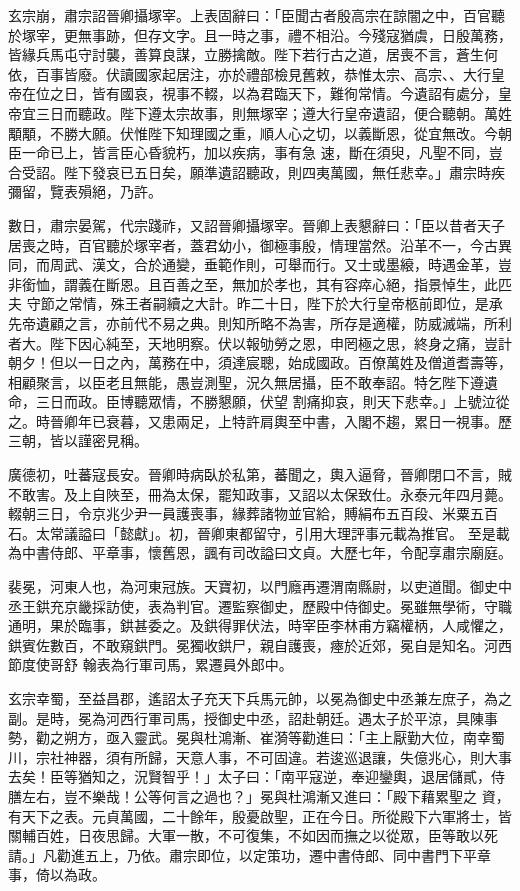 \begin{pinyinscope}
 玄宗崩，肅宗詔晉卿攝塚宰。上表固辭曰：「臣聞古者殷高宗在諒闇之中，百官聽於塚宰，更無事跡，但存文字。且一時之事，禮不相沿。今殘寇猶虞，日殷萬務，
 皆緣兵馬屯守討襲，善算良謀，立勝擒敵。陛下若行古之道，居喪不言，蒼生何依，百事皆廢。伏讀國家起居注，亦於禮部檢見舊敕，恭惟太宗、高宗、、大行皇帝在位之日，皆有國哀，視事不輟，以為君臨天下，難徇常情。今遺詔有處分，皇帝宜三日而聽政。陛下遵太宗故事，則無塚宰；遵大行皇帝遺詔，便合聽朝。萬姓顒顒，不勝大願。伏惟陛下知理國之重，順人心之切，以義斷恩，從宜無改。今朝臣一命已上，皆言臣心昏貌朽，加以疾病，事有急
 速，斷在須臾，凡聖不同，豈合受詔。陛下發哀已五日矣，願準遺詔聽政，則四夷萬國，無任悲幸。」肅宗時疾彌留，覽表殞絕，乃許。



 數日，肅宗晏駕，代宗踐祚，又詔晉卿攝塚宰。晉卿上表懇辭曰：「臣以昔者天子居喪之時，百官聽於塚宰者，蓋君幼小，御極事殷，情理當然。沿革不一，今古異同，而周武、漢文，合於通變，垂範作則，可舉而行。又士或墨縗，時遇金革，豈非銜恤，謂義在斷恩。且百善之至，無加於孝也，其有容瘁心絕，指景悼生，此匹夫
 守節之常情，殊王者嗣續之大計。昨二十日，陛下於大行皇帝柩前即位，是承先帝遺顧之言，亦前代不易之典。則知所略不為害，所存是適權，防威滅端，所利者大。陛下因心純至，天地明察。伏以報劬勞之恩，申罔極之思，終身之痛，豈計朝夕！但以一日之內，萬務在中，須達宸聰，始成國政。百僚萬姓及僧道耆壽等，相顧聚言，以臣老且無能，愚豈測聖，況久無居攝，臣不敢奉詔。特乞陛下遵遺命，三日而政。臣博聽眾情，不勝懇願，伏望
 割痛抑哀，則天下悲幸。」上號泣從之。時晉卿年已衰暮，又患兩足，上特許肩輿至中書，入閣不趨，累日一視事。歷三朝，皆以謹密見稱。



 廣德初，吐蕃寇長安。晉卿時病臥於私第，蕃聞之，輿入逼脅，晉卿閉口不言，賊不敢害。及上自陜至，冊為太保，罷知政事，又詔以太保致仕。永泰元年四月薨。輟朝三日，令京兆少尹一員護喪事，緣葬諸物並官給，賻絹布五百段、米粟五百石。太常議謚曰「懿獻」。初，晉卿東都留守，引用大理評事元載為推官。
 至是載為中書侍郎、平章事，懷舊恩，諷有司改謚曰文貞。大歷七年，令配享肅宗廟庭。



 裴冕，河東人也，為河東冠族。天寶初，以門廕再遷渭南縣尉，以吏道聞。御史中丞王鉷充京畿採訪使，表為判官。遷監察御史，歷殿中侍御史。冕雖無學術，守職通明，果於臨事，鉷甚委之。及鉷得罪伏法，時宰臣李林甫方竊權柄，人咸懼之，鉷賓佐數百，不敢窺鉷門。冕獨收鉷尸，親自護喪，瘞於近郊，冕自是知名。河西節度使哥舒
 翰表為行軍司馬，累遷員外郎中。



 玄宗幸蜀，至益昌郡，遙詔太子充天下兵馬元帥，以冕為御史中丞兼左庶子，為之副。是時，冕為河西行軍司馬，授御史中丞，詔赴朝廷。遇太子於平涼，具陳事勢，勸之朔方，亟入靈武。冕與杜鴻漸、崔漪等勸進曰：「主上厭勤大位，南幸蜀川，宗社神器，須有所歸，天意人事，不可固違。若逡巡退讓，失億兆心，則大事去矣！臣等猶知之，況賢智乎！」太子曰：「南平寇逆，奉迎鑾輿，退居儲貳，侍膳左右，豈不樂哉！公等何言之過也？」冕與杜鴻漸又進曰：「殿下藉累聖之
 資，有天下之表。元貞萬國，二十餘年，殷憂啟聖，正在今日。所從殿下六軍將士，皆關輔百姓，日夜思歸。大軍一散，不可復集，不如因而撫之以從眾，臣等敢以死請。」凡勸進五上，乃依。肅宗即位，以定策功，遷中書侍郎、同中書門下平章事，倚以為政。




\end{pinyinscope}
